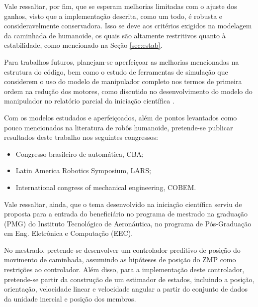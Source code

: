 Vale ressaltar, por fim, que se esperam melhorias limitadas com o ajuste dos ganhos, visto que a implementação descrita, como um todo, é robusta e consideravelmente conservadora. Isso se deve aos critérios exigidos na modelagem da caminhada de humanoide, os quais são altamente restritivos quanto à estabilidade, como mencionado na Seção \ref{sec:estab}. 

Para trabalhos futuros, planejam-se aperfeiçoar as melhorias mencionadas na estrutura do código, bem como o estudo de ferramentas de simulação que considerem o uso do modelo de manipulador completo nos termos de primeira ordem na redução dos motores, como discutido no desenvolvimento do modelo do manipulador no relatório parcial da iniciação científica \cite{parcial}.

Com os modelos estudados e aperfeiçoados, além de pontos levantados como pouco mencionados na literatura de robôs humanoide, pretende-se publicar resultados deste trabalho nos seguintes congressos:
\begin{itemize}
\item Congresso brasileiro de automática, CBA;
\item Latin America Robotics Symposium, LARS;
\item International congress of mechanical engineering, COBEM.
\end{itemize}

Vale ressaltar, ainda, que o tema desenvolvido na iniciação científica serviu de proposta para a entrada do beneficiário no programa de mestrado na graduação (PMG) do Instituto Tecnológico de Aeronáutica, no programa de Pós-Graduação em Eng. Eletrônica e Computação (EEC).

No mestrado, pretende-se desenvolver um controlador preditivo de posição do movimento de caminhada, assumindo as hipóteses de posição do ZMP como restrições ao controlador. Além disso, para a implementação deste controlador, pretende-se partir da construção de um estimador de estados, incluindo a posição, orientação, velocidade linear e velocidade angular a partir do conjunto de dados da unidade inercial e posição dos membros.





\newpage
\printbibliography
